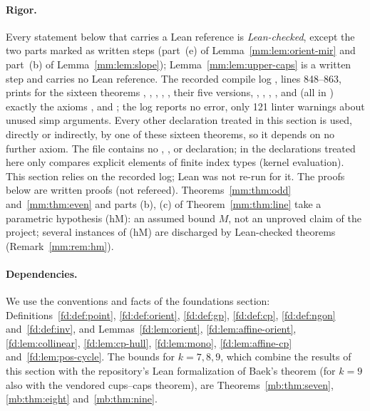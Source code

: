 \paragraph{Rigor.}
Every statement below that carries a Lean reference is \emph{Lean-checked}, except the two parts marked
as written steps (part~(e) of Lemma~\ref{mm:lem:orient-mir} and part~(b) of Lemma~\ref{mm:lem:slope});
Lemma~\ref{mm:lem:upper-caps} is a written step and carries no Lean reference. The recorded compile log
, lines 848--863, prints for the sixteen theorems ,
, , , , their five
 versions, , ,
, ,  and
 (all in ) exactly the axioms ,
 and ; the log reports no error, only 121 linter warnings about
unused simp arguments. Every other declaration treated in this section is used, directly or indirectly,
by one of these sixteen theorems, so it depends on no further axiom. The file contains no ,
,  or  declaration; in the declarations treated here
 only compares explicit elements of finite index types (kernel evaluation). This section
relies on the recorded log; Lean was not re-run for it. The proofs below are written proofs (not
refereed). Theorems~\ref{mm:thm:odd} and~\ref{mm:thm:even} and parts (b), (c) of Theorem~\ref{mm:thm:line} take a
parametric hypothesis (hM): an assumed bound $M$, not an unproved claim of the project; several instances of
(hM) are discharged by Lean-checked theorems (Remark~\ref{mm:rem:hm}).

\paragraph{Dependencies.}
We use the conventions and facts of the foundations section: Definitions~\ref{fd:def:point},
\ref{fd:def:orient}, \ref{fd:def:gp}, \ref{fd:def:cp}, \ref{fd:def:ngon} and~\ref{fd:def:inv}, and
Lemmas~\ref{fd:lem:orient}, \ref{fd:lem:affine-orient}, \ref{fd:lem:collinear}, \ref{fd:lem:cp-hull},
\ref{fd:lem:mono}, \ref{fd:lem:affine-cp} and~\ref{fd:lem:pos-cycle}. The bounds for $k=7,8,9$, which
combine the results of this section with the repository's Lean formalization of Baek's theorem (for
$k=9$ also with the vendored cups--caps theorem), are Theorems~\ref{mb:thm:seven}, \ref{mb:thm:eight}
and~\ref{mb:thm:nine}.

